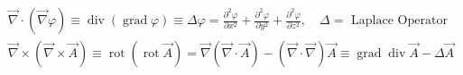 \begin{equation}
\begin{aligned}
&\vec{\nabla} \cdot(\vec{\nabla} \varphi) \equiv \operatorname{div}(\operatorname{grad} \varphi) \equiv \Delta \varphi=\frac{\partial^{2} \varphi}{\partial x^{2}}+\frac{\partial^{2} \varphi}{\partial y^{2}}+\frac{\partial^{2} \varphi}{\partial z^{2}}, \quad \Delta=\text { Laplace Operator }\\
&\vec{\nabla} \times(\vec{\nabla} \times \vec{A}) \equiv \operatorname{rot}(\operatorname{rot} \vec{A})=\vec{\nabla}(\vec{\nabla} \cdot \vec{A})-(\vec{\nabla} \cdot \vec{\nabla}) \vec{A} \equiv \operatorname{grad} \operatorname{div} \vec{A}-\Delta \vec{A}
\end{aligned}
\end{equation}